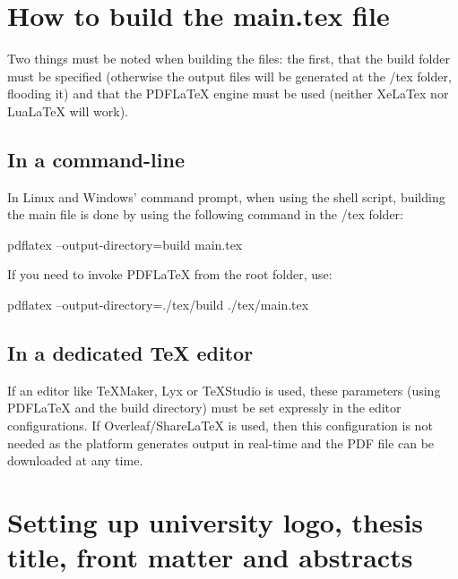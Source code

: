 	\section{How to build the main.tex file}%

	Two things must be noted when building the files: the first, that the build folder must be specified (otherwise the output files will be generated at the {\ttfamily\small /tex} folder, flooding it) and that the PDFLaTeX engine must be used (neither XeLaTex nor LuaLaTeX will work).

	\subsection{In a command-line}

	In Linux and Windows' command prompt, when using the shell script, building the main file is done by using the following command in the {\ttfamily\small /tex} folder:

\begin{center} {\ttfamily\small pdflatex --output-directory=build main.tex} \end{center}

	If you need to invoke PDFLaTeX from the root folder, use:

\begin{center} {\ttfamily\small pdflatex --output-directory=./tex/build ./tex/main.tex} \end{center}

	\subsection{In a dedicated TeX editor}

	If an editor like TeXMaker, Lyx or TeXStudio is used, these parameters (using PDFLaTeX and the build directory) must be set expressly in the editor configurations. If Overleaf/ShareLaTeX is used, then this configuration is not needed as the platform generates output in real-time and the PDF file can be downloaded at any time.

	\section{Setting up university logo, thesis title, front matter and abstracts}%

